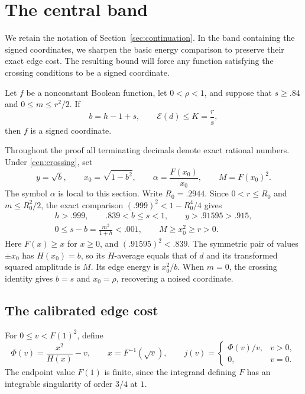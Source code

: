 \section{The central band}\label{sec:central}

We retain the notation of Section~\ref{sec:continuation}.  In the band
containing the signed coordinates, we sharpen the basic energy comparison
to preserve their exact edge cost.  The resulting bound will force any
function satisfying the crossing conditions to be a signed coordinate.

\begin{proposition}\label{prop:central}
Let $f$ be a nonconstant Boolean function, let $0<\rho<1$, and suppose that
$s\ge .84$ and $0\le m\le r^2/2$.  If
\begin{equation}\label{cen:crossing}
 b=h-1+s,\qquad \mathcal E(d)\le K=\frac rs,
\end{equation}
then $f$ is a signed coordinate.
\end{proposition}

Throughout the proof all terminating decimals denote exact rational
numbers.  Under \eqref{cen:crossing}, set
\begin{equation}\label{cen:calibration}
 y=\sqrt b,\qquad x_0=\sqrt{1-b^2},\qquad
 \alpha=\frac{F(x_0)}{x_0},\qquad M=F(x_0)^2.
\end{equation}
The symbol $\alpha$ is local to this section.  Write $R_0=.2944$.  Since
$0<r\le R_0$ and $m\le R_0^2/2$, the exact comparison
$(.999)^2<1-R_0^4/4$ gives
\begin{equation}\label{cen:domain}
 \begin{gathered}
 h>.999,\qquad .839<b\le s<1,\qquad y>.91595>.915,\\
 0\le s-b=\frac{m^2}{1+h}<.001,\qquad M\ge x_0^2\ge r>0.
 \end{gathered}
\end{equation}
Here $F(x)\ge x$ for $x\ge0$, and $(.91595)^2<.839$.
The symmetric pair of values $\pm x_0$ has $H(x_0)=b$, so its
$H$-average equals that of $d$ and its transformed squared amplitude is $M$.
Its edge energy is $x_0^2/b$.  When $m=0$, the crossing identity gives
$b=s$ and $x_0=\rho$, recovering a noised coordinate.

\subsection{The calibrated edge cost}

For $0\le v<F(1)^2$, define
\begin{equation}\label{cen:phi}
 \Phi(v)=\frac{x^2}{H(x)}-v,
 \qquad x=F^{-1}(\sqrt v),\qquad
 j(v)=\begin{cases}\Phi(v)/v,&v>0,\\0,&v=0.\end{cases}
\end{equation}
The endpoint value $F(1)$ is finite, since the integrand defining $F$ has
an integrable singularity of order $3/4$ at $1$.

